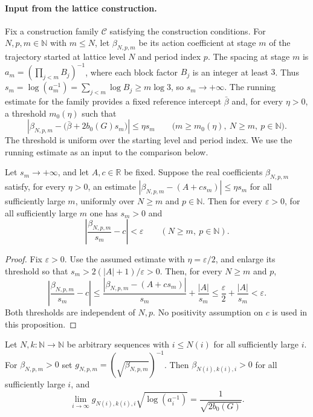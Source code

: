 \paragraph{Input from the lattice construction.}
Fix a construction family \(\mathcal C\) satisfying the construction
conditions. For \(N,p,m\in\mathbb N\) with \(m\le N\), let
\(\beta_{N,p,m}\) be its action coefficient at stage \(m\) of the
trajectory started at lattice level \(N\) and period index \(p\).
The spacing at stage \(m\) is \(a_m=(\prod_{j<m}B_j)^{-1}\), where each
block factor \(B_j\) is an integer at least \(3\). Thus
\(s_m=\log(a_m^{-1})=\sum_{j<m}\log B_j\ge m\log 3\), so \(s_m\to+\infty\).
The running estimate for the family provides a fixed reference intercept
\(\bar\beta\) and, for every
\(\eta>0\), a threshold \(m_0(\eta)\) such that
\begin{equation}
 \left|\beta_{N,p,m}-\bigl(\bar\beta+2b_0(G)s_m\bigr)\right|
 \leq \eta s_m
 \qquad
 \bigl(m\geq m_0(\eta),\ N\geq m,\ p\in\mathbb N\bigr).
 \label{eq:running}
\end{equation}
The threshold is uniform over the starting level and period index.
We use the running estimate as an input to the comparison below.

\begin{proposition}
\label{prop:uniform-extraction}
Let $s_m\to+\infty$, and let $A,c\in\mathbb R$ be fixed. Suppose the real
coefficients $\beta_{N,p,m}$ satisfy, for every $\eta>0$, an estimate
$|\beta_{N,p,m}-(A+cs_m)|\le\eta s_m$ for all sufficiently large $m$,
uniformly over $N\ge m$ and $p\in\mathbb N$.
Then for every $\varepsilon>0$, for all sufficiently large $m$ one has $s_m>0$
and
\[
 \left|\frac{\beta_{N,p,m}}{s_m}-c\right|<\varepsilon
 \qquad(N\ge m,\ p\in\mathbb N).
\]
\end{proposition}

\begin{proof}
Fix $\varepsilon>0$. Use the assumed estimate with $\eta=\varepsilon/2$,
and enlarge its threshold so that $s_m>2(|A|+1)/\varepsilon>0$.
Then, for every $N\ge m$ and $p$,
\[
 \left|\frac{\beta_{N,p,m}}{s_m}-c\right|
 \le \frac{|\beta_{N,p,m}-(A+cs_m)|}{s_m}+\frac{|A|}{s_m}
 \le\frac\varepsilon2+\frac{|A|}{s_m}<\varepsilon.
\]
Both thresholds are independent of $N,p$. No positivity assumption on $c$
is used in this proposition.
\end{proof}

\begin{proposition}
\label{prop:running-asymptotic}
Let \(N,k:\mathbb N\to\mathbb N\) be arbitrary sequences with \(i\leq N(i)\)
for all sufficiently large \(i\). For \(\beta_{N,p,m}>0\) set
\(g_{N,p,m}=(\sqrt{\beta_{N,p,m}})^{-1}\). Then
\(\beta_{N(i),k(i),i}>0\) for all sufficiently large \(i\), and
\[
  \lim_{i\to\infty}g_{N(i),k(i),i}\sqrt{\log(a_i^{-1})}
  =\frac{1}{\sqrt{2b_0(G)}}.
\]
\end{proposition}

